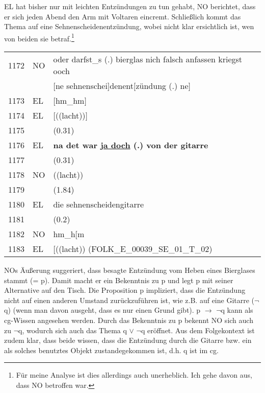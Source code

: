 EL hat bisher nur mit leichten Entzündungen zu tun gehabt, NO berichtet, dass er sich jeden Abend den Arm mit Voltaren eincremt. Schließlich kommt das Thema auf eine Sehnenscheidenentzündung, wobei nicht klar ersichtlich ist, wen von beiden sie betraf.\footnote{Für meine Analyse ist dies allerdings auch unerheblich. Ich gehe davon aus, dass NO betroffen war.}

\begin{exe}
	\ex\label{456} 
		\begin{tabular}[t]{lll} 
 		1172 & NO & oder darfst\_s (.) bierglas nich falsch anfassen kriegst ooch \tabularnewline
 		& & $[$ne sehnenschei$]$denent$[$zündung (.) ne$]$ \tabularnewline
 		1173 & EL & $[$hm\_hm$]$ \tabularnewline
 		1174 & EL & $[$((lacht))$]$ \tabularnewline
 		1175 &	& (0.31) \tabularnewline
		1176 & EL &	\textbf{na det war \underline{ja doch} (.) von der gitarre} \tabularnewline
		1177 &	& (0.31) \tabularnewline
		1178 & NO & ((lacht)) \tabularnewline
 		1179 &	& (1.84) \tabularnewline
		1180 & EL & die sehnenscheidengitarre \tabularnewline
		1181 & & (0.2) \tabularnewline
		1182 & NO & hm\_h$[$m \tabularnewline
		1183 & EL & $[$((lacht))
		\hfill\hbox {(FOLK\_E\_00039\_SE\_01\_T\_02)}			
  		\end{tabular} 						
\end{exe}	
NOs Äußerung suggeriert, dass besagte Entzündung vom Heben eines Bierglases stammt (= p). Damit macht er ein Bekenntnis zu p und legt p mit seiner Alternative auf den Tisch. Die Proposition p  impliziert, dass die Entzündung nicht auf einen anderen Umstand zurückzuführen ist, wie z.B. auf eine Gitarre ($\neg$q) (wenn man davon ausgeht, dass es nur einen Grund gibt). p $\rightarrow$ $\neg$q kann als cg-Wissen angesehen werden. Durch das Bekenntnis zu p bekennt NO sich auch zu $\neg$q, wodurch sich auch das Thema q $\vee$ $\neg$q eröffnet. Aus dem Folgekontext ist zudem klar, dass beide wissen, dass die Entzündung durch die Gitarre bzw. ein als solches benutztes Objekt zustandegekommen ist, d.h. q ist im cg.

